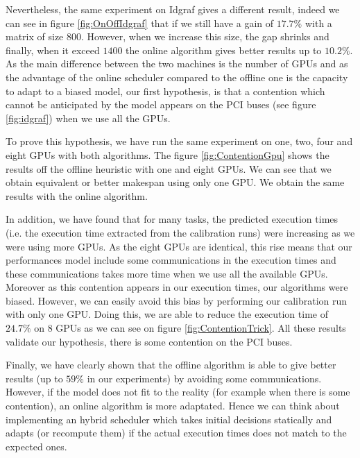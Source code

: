 \documentclass[10pt, conference, compsocconf,pdftex,dvipsnames]{IEEEtran}
\begin{document}
Nevertheless, the same experiment on Idgraf gives a different result, indeed
we can see in figure \ref{fig:OnOffIdgraf} that if we still have a gain of
$17.7\%$ with a matrix of size $800$. However, when we increase this size, the
gap shrinks and finally, when it exceed $1400$ the online algorithm gives
better results up to $10.2\%$. As the main difference between the two machines
is the number of GPUs and as the advantage of the online scheduler compared to
the offline one is the capacity to adapt to a biased model, our first
hypothesis, is that a contention which cannot be anticipated by the model
appears on the PCI buses (see figure \ref{fig:idgraf}) when we use all the
GPUs. 

To prove this hypothesis, we have run the same experiment on one, two, four
and eight GPUs with both algorithms. The figure \ref{fig:ContentionGpu} shows the
results off the offline heuristic with one and eight GPUs. We can see that we
obtain equivalent or better makespan using only one GPU. We obtain the same
results with the online algorithm.
%

In addition, we have found that for many tasks, the predicted execution times
(i.e. the execution time extracted from the calibration runs) were increasing
as we were using more GPUs. As the eight GPUs are identical, this rise means
that our performances model include some communications in the execution times
and these communications takes more time when we use all the available GPUs.
Moreover as this contention appears in our execution times, our algorithms
were biased. However, we can easily avoid this bias by performing our
calibration run with only one GPU. Doing this, we are able to reduce the
execution time of $24.7\%$ on 8 GPUs as we can see on figure
\ref{fig:ContentionTrick}. All these results validate our hypothesis, there is
some contention on the PCI buses.

Finally, we have clearly shown that the offline algorithm is able to give
better results (up to $59\%$ in our experiments) by avoiding some
communications. However, if the model does not fit to the reality (for example
when there is some contention), an online algorithm is more adaptated. Hence
we can think about implementing an hybrid scheduler which takes initial
decisions statically and adapts (or recompute them) if the actual execution
times does not match to the expected ones.
\end{document}
